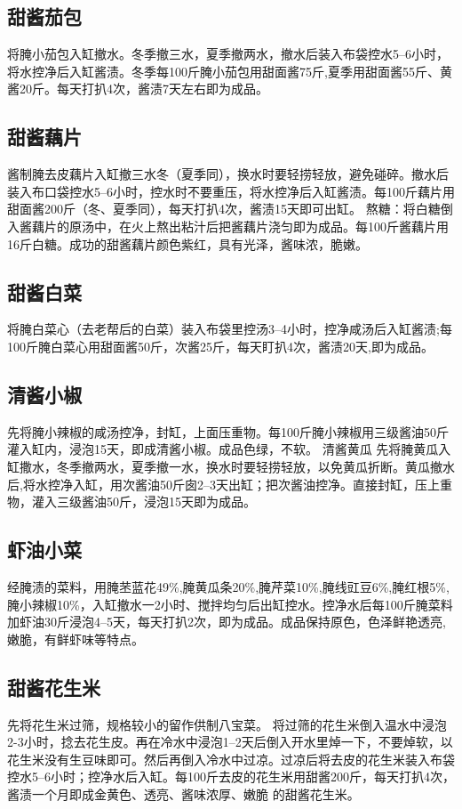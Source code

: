 \documentclass{ctexbook}
\begin{document}
\subsection{甜酱茄包}
将腌小茄包入缸撤水。冬季撤三水，夏季撤两水，撤水后装入布袋控水5--6小时，将水控净后入缸酱渍。冬季每100斤腌小茄包用甜面酱75斤,夏季用甜面酱55斤、黄酱20斤。每天打扒4次，酱渍7天左右即为成品。
\subsection{甜酱藕片}
酱制腌去皮藕片入缸撤三水冬（夏季同），换水时要轻捞轻放，避免碰碎。撤水后装入布口袋控水5--6小时，控水时不要重压，将水控净后入缸酱渍。每100斤藕片用甜面酱200斤（冬、夏季同），每天打扒4次，酱渍15天即可出缸。
熬糖：将白糖倒入酱藕片的原汤中，在火上熬出粘汁后把酱藕片浇匀即为成品。每100斤酱藕片用16斤白糖。成功的甜酱藕片颜色紫红，具有光泽，酱味浓，脆嫩。
\subsection{甜酱白菜}
将腌白菜心（去老帮后的白菜）装入布袋里控汤3--4小时，控净咸汤后入缸酱渍;每100斤腌白菜心用甜面酱50斤，次酱25斤，每天盯扒4次，酱渍20天,即为成品。
\subsection{清酱小椒}
先将腌小辣椒的咸汤控净，封缸，上面压重物。每100斤腌小辣椒用三级酱油50斤灌入缸内，浸泡15天，即成清酱小椒。成品色绿，不软。
清酱黄瓜
先将腌黄瓜入缸撒水，冬季撤两水，夏季撤一水，换水时要轻捞轻放，以免黄瓜折断。黄瓜撤水后,将水控净入缸，用次酱油50斤囱2--3天出缸；把次酱油控净。直接封缸，压上重物，灌入三级酱油50斤，浸泡15天即为成品。
\subsection{虾油小菜}
经腌渍的菜料，用腌苤蓝花49\%,腌黄瓜条20\%,腌芹菜10\%,腌线豇豆6\%,腌红根5\%,腌小辣椒10\%，入缸撤水一2小时、搅拌均匀后出缸控水。控净水后每100斤腌菜料加虾油30斤浸泡4--5天，每天打扒2次，即为成品。成品保持原色，色泽鲜艳透亮,嫩脆，有鲜虾味等特点。
\subsection{甜酱花生米}
先将花生米过筛，规格较小的留作供制八宝菜。
将过筛的花生米倒入温水中浸泡2-3小时，捻去花生皮。再在冷水中浸泡1--2天后倒入开水里焯一下，不要焯软，以花生米没有生豆味即可。然后再倒入冷水中过凉。过凉后将去皮的花生米装入布袋控水5--6小时；控净水后入缸。每100斤去皮的花生米用甜酱200斤，每天打扒4次，酱渍一个月即成金黄色、透亮、酱味浓厚、嫩脆
的甜酱花生米。
\end{document}
